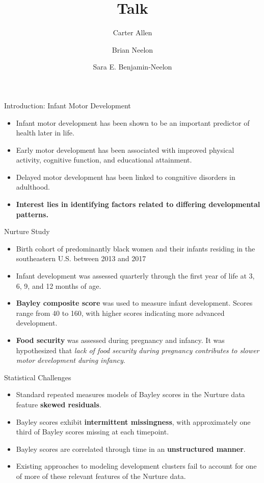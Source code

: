 \documentclass[ignorenonframetext,]{beamer}
\title{Talk}
\author{Carter Allen \and Brian Neelon \and Sara E. Benjamin-Neelon}
\date{}
\begin{document}
\frame{\titlepage}

\begin{frame}{Introduction: Infant Motor Development}
\protect\hypertarget{introduction-infant-motor-development}{}

\begin{itemize}
\item
  Infant motor development has been shown to be an important predictor
  of health later in life.
\item
  Early motor development has been associated with improved physical
  activity, cognitive function, and educational attainment.
\item
  Delayed motor development has been linked to congnitive disorders in
  adulthood.
\item
  \textbf{Interest lies in identifying factors related to differing
  developmental patterns.}
\end{itemize}

\end{frame}

\begin{frame}{Nurture Study}
\protect\hypertarget{nurture-study}{}

\begin{itemize}
\item
  Birth cohort of predominantly black women and their infants residing
  in the southeastern U.S. between 2013 and 2017
\item
  Infant development was assessed quarterly through the first year of
  life at 3, 6, 9, and 12 months of age.
\item
  \textbf{Bayley composite score} was used to measure infant
  development. Scores range from 40 to 160, with higher scores
  indicating more advanced development.
\item
  \textbf{Food security} was assessed during pregnancy and infancy. It
  was hypothesized that \emph{lack of food security during pregnancy
  contributes to slower motor development during infancy}.
\end{itemize}

\end{frame}

\begin{frame}{Statistical Challenges}
\protect\hypertarget{statistical-challenges}{}

\begin{itemize}
\item
  Standard repeated measures models of Bayley scores in the Nurture data
  feature \textbf{skewed residuals}.
\item
  Bayley scores exhibit \textbf{intermittent missingness}, with
  approximately one third of Bayley scores missing at each timepoint.
\item
  Bayley scores are correlated through time in an \textbf{unstructured
  manner}.
\item
  Existing approaches to modeling development clusters fail to account
  for one of more of these relevant features of the Nurture data.
\end{itemize}

\end{frame}
\end{document}
